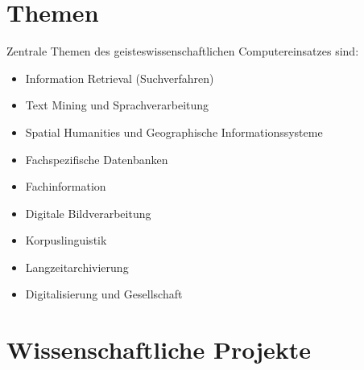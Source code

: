 \documentclass{article}
\begin{document}
\section{Themen}
Zentrale Themen des geisteswissenschaftlichen Computereinsatzes sind:

\begin{itemize}
\item Information Retrieval (Suchverfahren)
\item Text Mining und Sprachverarbeitung
\item Spatial Humanities und Geographische Informationssysteme
\item Fachspezifische Datenbanken
\item Fachinformation
\item Digitale Bildverarbeitung
\item Korpuslinguistik
\item Langzeitarchivierung
\item Digitalisierung und Gesellschaft
\end{itemize}


\section{Wissenschaftliche Projekte}
\end{document}
